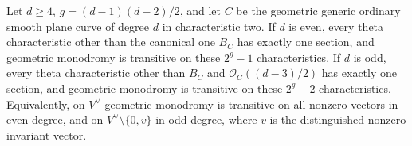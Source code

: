 \begin{theorem}
\label{thm:all-char2-theta-orbits}
Let $d\ge4$, $g=(d-1)(d-2)/2$, and let $C$ be the geometric
generic ordinary smooth plane curve of degree $d$ in characteristic
two.
If $d$ is even, every theta characteristic other than the canonical
one $B_C$ has exactly one section, and geometric monodromy is
transitive on these $2^g-1$ characteristics.
If $d$ is odd, every theta characteristic other than $B_C$ and
$\mathcal O_C((d-3)/2)$ has exactly one section, and geometric
monodromy is transitive on these $2^g-2$ characteristics.
Equivalently, on $V^\vee$ geometric monodromy is transitive on
all nonzero vectors in even degree, and on
$V^\vee\setminus\{0,v\}$ in odd degree, where $v$ is the
distinguished nonzero invariant vector.
\end{theorem}

